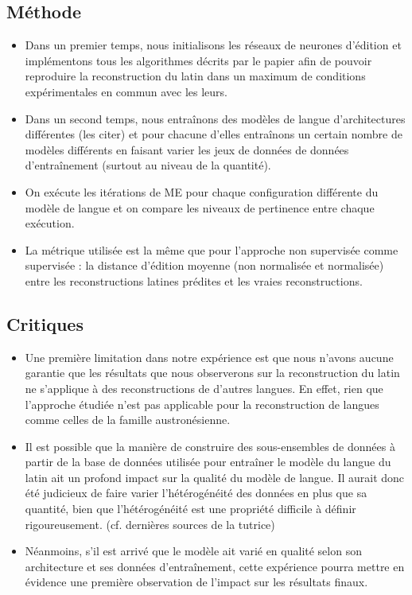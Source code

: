 \documentclass[12pt, french, twoside]{report}
\begin{document}
\subsection{Méthode}
\begin{itemize}
    \item Dans un premier temps, nous initialisons les réseaux de neurones d'édition et implémentons tous les algorithmes décrits par le papier afin de pouvoir reproduire la reconstruction du latin dans un maximum de conditions expérimentales en commun avec les leurs.
    \item Dans un second temps, nous entraînons des modèles de langue d'architectures différentes (les citer) et pour chacune d'elles entraînons un certain nombre de modèles différents en faisant varier les jeux de données de données d'entraînement (surtout au niveau de la quantité).
    \item On exécute les itérations de ME pour chaque configuration différente du modèle de langue et on compare les niveaux de pertinence entre chaque exécution.
    \item La métrique utilisée est la même que pour l'approche non supervisée comme supervisée : la distance d'édition moyenne (non normalisée et normalisée) entre les reconstructions latines prédites et les vraies reconstructions.
\end{itemize}

\subsection{Critiques}
\begin{itemize}
    \item Une première limitation dans notre expérience est que nous n'avons aucune garantie que les résultats que nous observerons sur la reconstruction du latin ne s'applique à des reconstructions de d'autres langues. En effet, rien que l'approche étudiée n'est pas applicable pour la reconstruction de langues comme celles de la famille austronésienne.
    \item Il est possible que la manière de construire des sous-ensembles de données à partir de la base de données utilisée pour entraîner le modèle du langue du latin ait un profond impact sur la qualité du modèle de langue. Il aurait donc été judicieux de faire varier l'hétérogénéité des données en plus que sa quantité, bien que l'hétérogénéité est une propriété difficile à définir rigoureusement. (cf. dernières sources de la tutrice)
    \item Néanmoins, s'il est arrivé que le modèle ait varié en qualité selon son architecture et ses données d'entraînement, cette expérience pourra mettre en évidence une première observation de l'impact sur les résultats finaux.
\end{itemize}
\end{document}
